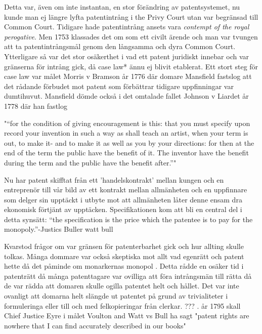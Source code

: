 Detta var, även om inte instantan, en stor förändring av patentsystemet, nu kunde man ej längre lyfta patentintrång i the Privy Court utan var begränsad till Common Court. Tidigare hade patentintrång ansets vara \emph{contempt of the royal perogative}. Men 1753 klassades det om som ett civilt ärende och man var tvungen att ta patentintrångsmål genom den långsamma och dyra Common Court. Ytterligare så var det stor osäkerthet i vad ett patent juridiskt innebar och var gränserna för intrång gick, då case law* ännu ej blivit etablerat. Ett stort steg för case law var målet Morris v Bramson år 1776 där domare Mansfield fastslog att det rådande förbudet mot patent som förbättrar tidigare uppfinningar var dumtihuvut\cite{bracha}. Mansfield dömde också i det omtalade fallet Johnson v Liardet år 1778 där han fastlog

"“for the condition of giving encouragement is this: that 
you must specify upon record your invention in such a 
way as shall teach an artist, when your term is out, to 
make it- and to make it as well as you by your directions: 
for then at the end of the term the public have the benefit 
of it. The inventor have the benefit during the term and 
the public have the benefit after.”" \cite{hulme}

Nu har patent skifftat från ett 'handelskontrakt' mellan kungen och en entreprenör till vår bild av ett kontrakt mellan allmänheten och en uppfinnare som delger sin upptäckt i utbyte mot att allmänheten låter denne ensam dra ekonomisk förtjänt av upptäcken. Specifikationen kom att bli en central del i detta synsätt: “the specification is the price which 
the patentee is to pay for the monopoly.”-Justics Buller watt bull \cite{2 H. Bl. 463, 472, 126 Eng. Rep. 651, 656 (C.P. 1795)}



Kvarstod frågor om var gränsen för patenterbarhet gick och hur allting skulle tolkas\cite{bracha}. Många dommare var också skeptiska mot allt vad egenrätt och patent hette då det påminde om monarkernas monopol \cite{macleod ??? }.
Detta rådde en osäker tid i patenträtt då många patenttagare var ovilliga att föra intrångsmän till
rätta då de var rädda att domaren skulle ogilla patentet helt och hållet. Det var inte ovanligt att
domarna helt slängde ut patentet på grund av trivialiteter i formuleringa eller till och med
felkopieringar från clerkar. ??? . år 1795 skall Chief Justice Eyre i målet Voulton and Watt vs Bull ha
sagt "patent rights are nowhere that I can find accurately described in our books"

